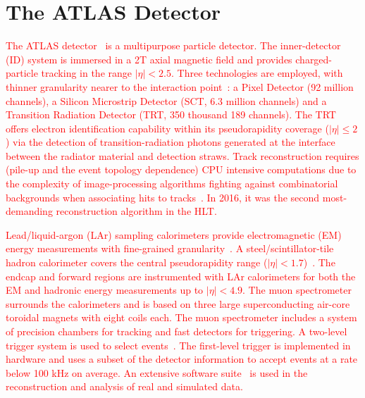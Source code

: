 


\chapter{The ATLAS Detector}\label{sec:atlas}

\textcolor{red}{
The ATLAS detector~\cite{PERF-2007-01} is a multipurpose particle detector. The inner-detector (ID) system is immersed in a 2T  axial magnetic field and provides charged-particle tracking in the range $|\eta|<2.5$.  Three technologies are employed, with thinner granularity nearer to the interaction point~\cite{PERF-2015-08,CERN-LHCC-97-016,Haywood:331064}: a Pixel Detector (92 million channels), a Silicon Microstrip Detector (SCT, 6.3 million channels) and a Transition Radiation Detector (TRT, 350 thousand 189 channels). The TRT offers electron identification capability within its pseudorapidity coverage ($|\eta|\leq 2$) via the detection of transition-radiation photons generated at the interface between the radiator material and detection straws. Track reconstruction requires (pile-up and the event topology dependence) CPU intensive computations due to the complexity of image-processing algorithms fighting against combinatorial backgrounds when associating hits to tracks~\cite{PERF-2015-08}. In 2016, it was the second most-demanding reconstruction algorithm in the HLT.}

\textcolor{red}{Lead/liquid-argon (LAr) sampling calorimeters provide electromagnetic (EM) energy measurements with fine-grained granularity~\cite{LARG-2009-01,larg_tdr}. A steel/scintillator-tile hadron calorimeter covers the central pseudorapidity range ($|\eta|< 1.7$)~\cite{TCAL-2017-01,tile_tdr}. The endcap and forward regions are instrumented with LAr calorimeters for both the EM and hadronic energy measurements up to $|\eta|< 4.9$. The muon spectrometer surrounds the calorimeters and is based on three large superconducting air-core toroidal magnets with eight coils each.  The muon spectrometer includes a system of precision chambers for tracking and fast detectors for triggering. A two-level trigger system is used to select events~\cite{aad2020performance}. The first-level trigger is implemented in hardware and uses a subset of the detector information to accept events at a rate below 100 kHz on average. An extensive software suite~\cite{ATL-SOFT-PUB-2021-001} is used in the reconstruction and analysis of real and simulated data.
}







